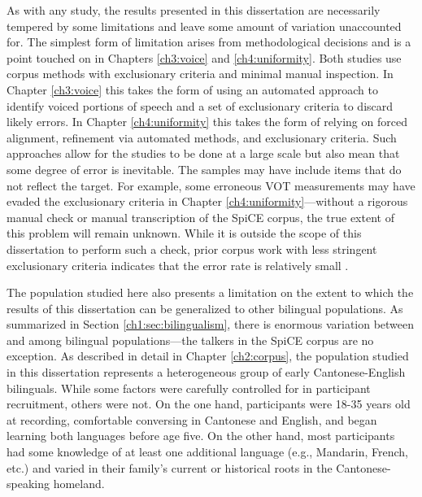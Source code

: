 As with any study, the results presented in this dissertation are necessarily tempered by some limitations and leave some amount of variation unaccounted for. The simplest form of limitation arises from methodological decisions and is a point touched on in Chapters \ref{ch3:voice} and \ref{ch4:uniformity}. Both studies use corpus methods with exclusionary criteria and minimal manual inspection. In Chapter \ref{ch3:voice} this takes the form of using an automated approach to identify voiced portions of speech and a set of exclusionary criteria to discard likely errors. In Chapter \ref{ch4:uniformity} this takes the form of relying on forced alignment, refinement via automated methods, and exclusionary criteria. Such approaches allow for the studies to be done at a large scale but also mean that some degree of error is inevitable. The samples may have include items that do not reflect the target. For example, some erroneous VOT measurements may have evaded the exclusionary criteria in Chapter \ref{ch4:uniformity}---without a rigorous manual check or manual transcription of the SpiCE corpus, the true extent of this problem will remain unknown. While it is outside the scope of this dissertation to perform such a check, prior corpus work with less stringent exclusionary criteria indicates that the error rate is relatively small \citep{chodroff_2017_structure}.

The population studied here also presents a limitation on the extent to which the results of this dissertation can be generalized to other bilingual populations. As summarized in Section \ref{ch1:sec:bilingualism}, there is enormous variation between and among bilingual populations---the talkers in the SpiCE corpus are no exception. As described in detail in Chapter \ref{ch2:corpus}, the population studied in this dissertation represents a heterogeneous group of early Cantonese-English bilinguals. While some factors were carefully controlled for in participant recruitment, others were not. On the one hand, participants were 18-35 years old at recording, comfortable conversing in Cantonese and English, and began learning both languages before age five. On the other hand, most participants had some knowledge of at least one additional language (e.g., Mandarin, French, etc.) and varied in their family's current or historical roots in the Cantonese-speaking homeland.  

